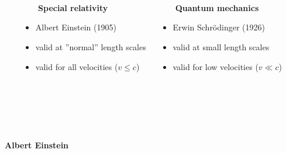 \documentclass[mathserif,8pt]{beamer}
\begin{document}
\begin{frame}
    \ \\
    \ \\
    \ \\
    \begin{columns}
    \begin{column}{.15\textwidth}
	\ \\
    \end{column}
    \begin{column}{.35\textwidth}
    \ \ \ \ \textbf{Special relativity}
    \begin{itemize}
	\item Albert Einstein (1905)
	\item valid at ''normal'' length scales
	\item valid for all velocities ($v \leq c$)
    \end{itemize}
    \end{column}
    \begin{column}{.35\textwidth}
    \ \ \ \ \textbf{Quantum mechanics}
    \begin{itemize}
	\item Erwin Schr\"{o}dinger (1926)
	\item valid at small length scales
	\item valid for low velocities ($v \ll c$)
    \end{itemize}
    \end{column}
    \begin{column}{.15\textwidth}
	\ \\
    \end{column}
    \end{columns}
    \ \\
    \ \\
    \ \\
    \begin{columns}
    \begin{column}{.30\textwidth}
	\centering
	\textbf{Albert Einstein}\\

\end{column}
\end{columns}
\end{frame}
\end{document}
